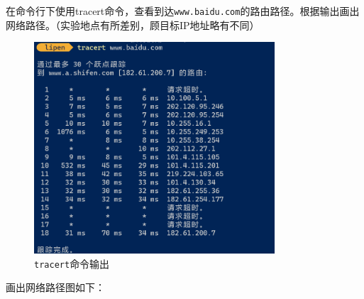 \documentclass{article}
\begin{document}
在命令行下使用tracert命令，查看到达\texttt{www.baidu.com}的路由路径。根据输出画出网络路径。（实验地点有所差别，顾目标IP地址略有不同）

\begin{figure}[H]
  \centering
  \includegraphics[width=0.8\textwidth]{img/22.png}
  \caption{\texttt{tracert}命令输出}
  \label{fig:21}
\end{figure}

画出网络路径图如下：
\end{document}
